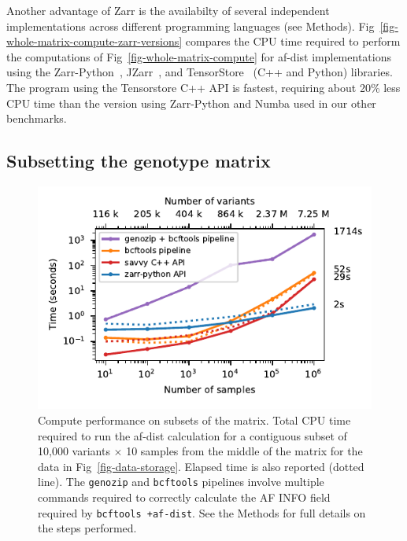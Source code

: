 \documentclass[a4paper,num-refs]{oup-contemporary}
\begin{document}
Another advantage of Zarr is the availabilty of several 
independent implementations across different programming languages
(see Methods). Fig~\ref{fig-whole-matrix-compute-zarr-versions}
compares the CPU time required to perform the computations
of Fig~\ref{fig-whole-matrix-compute} 
for af-dist implementations using the Zarr-Python~\cite{zarrpython},
JZarr~\cite{jzarr},
and TensorStore~\citep{tensorstore} (C++ and Python) libraries.
The program using the Tensorstore C++ API is fastest, requiring 
about 20\% less CPU time than the version using Zarr-Python and Numba
used in our other benchmarks.


\subsection{Subsetting the genotype matrix}
\begin{figure}[t]
\includegraphics{figures/subset-matrix-compute}
\caption{Compute performance on subsets of the matrix.
Total CPU time required to run the af-dist calculation for
a contiguous subset of 10,000 variants $\times$ 10 samples 
from the middle of the matrix
for the data in Fig~\ref{fig-data-storage}.
Elapsed time is also reported (dotted line). 
The \texttt{genozip} and \texttt{bcftools} pipelines involve
multiple commands required to correctly calculate the AF INFO field
required by \texttt{bcftools +af-dist}. See the Methods for full details
on the steps performed.
\label{fig-subset-matrix-compute}}
\end{figure}
\end{document}
